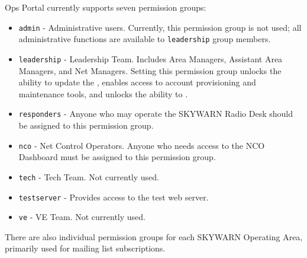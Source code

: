 \documentclass[pdflatex,letterpaper,twoside,12pt]{book}
\begin{document}
Ops Portal currently supports seven permission groups:

\begin{itemize}
\item \verb|admin| - Administrative users.  Currently, this permission group is not used;  all administrative functions are available to \verb|leadership| group members.
\item \verb|leadership| - Leadership Team.  Includes Area Managers, Assistant Area Managers, and Net Managers.  Setting this permission group unlocks the ability to update the , enables access to account provisioning and maintenance tools, and unlocks the ability to .
\item \verb|responders| - Anyone who may operate the SKYWARN Radio Desk should be assigned to this permission group.
\item \verb|nco| - Net Control Operators.  Anyone who needs access to the NCO Dashboard must be assigned to this permission group.
\item \verb|tech| - Tech Team.  Not currently used.
\item \verb|testserver| - Provides access to the test web server.
\item \verb|ve| - VE Team.  Not currently used.
\end{itemize}

There are also individual permission groups for each SKYWARN Operating Area, primarily used for mailing list subscriptions.

\end{document}
